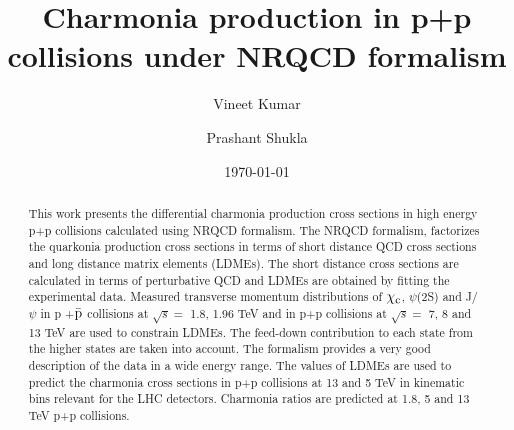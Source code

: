 \documentclass[aps,prc,preprint,superscriptaddress,showpacs,showkeys,amsmath]{revtex4-1}
\begin{document}
\newcommand{\Jpsi}{J/\psi}
\newcommand{\pT}{p_{T}}
\newcommand{\calO}{{\cal{O}}}
\newcommand{\barQ}{{\bar{Q}}}
\newcommand{\barq}{{\bar{q}}}
\newcommand{\barc}{{\bar{c}}}
\newcommand{\barb}{{\bar{b}}}
\newcommand{\baru}{\bar{u}}
\newcommand{\barv}{\bar{v}}
\newcommand{\barup}{\bar{u}_{+}}
\newcommand{\barum}{\bar{u}_{-}}
\newcommand{\barvp}{\bar{v}_{+}}
\newcommand{\barvm}{\bar{v}_{-}}
\newcommand{\charm}{{\rm{charm}}}
\newcommand{\bottom}{{\rm{bottom}}}
\newcommand{\cs}{{\hat{s}}}
\newcommand{\ct}{{\hat{t}}}
\newcommand{\cu}{{\hat{u}}}
\newcommand{\alphas}{{\alpha_{s}}}
\newcommand{\shat}{\hat{\rm s}}
\newcommand{\that}{\hat{\rm t}}
\newcommand{\uhat}{\hat{\rm u}}
\newcommand{\zhat}{\hat{\rm z}}
\newcommand{\CA}{{\cal A}}
\newcommand{\Qbar}{{\overline Q}}
\newcommand{\QQbaroctetgen}{{Q\Qbar[ ^{2S+1}L_J^{(8)}]}}
\newcommand{\QQbaroctetsingS}{{Q\Qbar[ ^1S_0^{(8)}]}}
\newcommand{\QQbaroctettripP}{{Q\Qbar[ ^3P_J^{(8)}]}}
\newcommand{\QQbaroctettripPone}{{Q\Qbar[ ^3P_1^{(8)}]}}
\def\QQbaroctettripS{Q\Qbar[ ^3S_1^{(8)}]}
\def\QQbaroctetPzero{Q\Qbar[ ^3P_0^{(8)}]}
\def\QQbaroctetPone{Q\Qbar[ ^3P_1^{(8)}]}
\def\QQbaroctetPtwo{Q\Qbar[ ^3P_2^{(8)}]}
\title{{\Large Charmonia production in p+p collisions under NRQCD formalism}} 
\author{\large Vineet Kumar}
\author{\large Prashant Shukla}
\date{\today}

\begin{abstract}
  This work presents the differential charmonia production cross sections in high 
  energy p+p collisions calculated  using NRQCD formalism. The NRQCD formalism, 
  factorizes the quarkonia production cross sections in terms of short distance QCD 
  cross sections and long distance matrix elements (LDMEs). The short distance cross
  sections are calculated in terms of perturbative QCD and LDMEs are obtained by 
  fitting the experimental data. Measured transverse momentum distributions of 
  $\chi_{\rm c}$, $\psi$(2S) and J/$\psi$ in p +{$\bar {\rm p}$} collisions at $\sqrt{s}=$ 1.8, 1.96 TeV 
  and in p+p collisions at $\sqrt{s}=$  7, 8 and 13 TeV are used to constrain LDMEs. The feed-down 
  contribution to each state from the higher states are taken into account.
  The formalism provides a very good description of the data in a wide energy range. 
  The values of LDMEs are used to predict the charmonia cross sections in p+p collisions 
  at 13 and 5 TeV in kinematic bins relevant for the LHC detectors. Charmonia ratios are
  predicted at 1.8, 5 and 13 TeV  p+p collisions.
\end{abstract}
\end{document}
